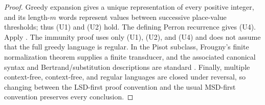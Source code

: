 \begin{proof}
  Greedy expansion gives a unique representation of every positive
  integer, and its length-\(m\) words represent values between successive
  place-value thresholds; thus \textup{(U1)} and \textup{(U2)} hold. The defining
  Perron recurrence gives \textup{(U4)}. Apply
  . The immunity proof
  uses only \textup{(U1)}, \textup{(U2)}, and \textup{(U4)} and does not
  assume that the full greedy language is regular. In the Pisot subclass,
  Frougny's finite
  normalization theorem supplies a finite transducer, and the associated
  canonical syntax and Bertrand/substitution descriptions are standard
  \cite{Frougny1992,BruyereHansel1997,Fabre1995,FrougnySolomyak1992}.
  Finally, multiple context-free, context-free, and
  regular languages are closed under reversal, so changing between the LSD-first proof
  convention and the usual MSD-first convention preserves every
  conclusion.
\end{proof}

